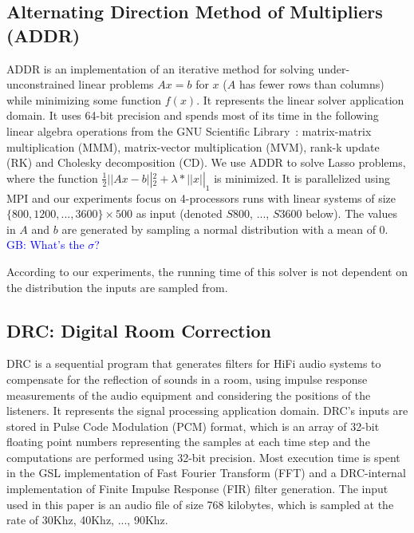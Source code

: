 \documentclass[10pt, conference, compsocconf]{IEEEtran}
\newcommand{\greg}[1]{%
  \textcolor{blue}{GB: #1}
}
\begin{document}
\subsection{Alternating Direction Method of Multipliers (ADDR)}
\label{sec:apps:lasso}
ADDR is an implementation of an iterative method for solving under-unconstrained linear problems $Ax=b$ for $x$ ($A$ has fewer rows than columns) while minimizing some function $f(x)$.
It represents the linear solver application domain.
It uses 64-bit precision and spends most of its time in the following linear algebra operations from the GNU Scientific Library~\cite{gsl:2011}: matrix-matrix multiplication (MMM), matrix-vector multiplication (MVM), rank-k update (RK) and Cholesky decomposition (CD).
We use ADDR to solve Lasso problems, where the function $\frac{1}{2} \left|| Ax - b \right||_2^2 + \lambda*\left|| x \right||_1$ is minimized.
It is parallelized using MPI and our experiments focus on 4-processors runs with linear systems of size $\{800, 1200, ..., 3600\} \times 500$ as input (denoted $S800$, ..., $S3600$ below).%
The values in $A$ and $b$ are generated by sampling a normal distribution with a mean of 0. \greg{What's the $\sigma$?}
According to our experiments, the running time of this solver is not dependent on the distribution the inputs are sampled from.

\subsection{DRC: Digital Room Correction}
\label{sec:apps:drc}

DRC is a sequential program that generates filters for HiFi audio systems to compensate for the reflection of sounds in a room, using impulse response measurements of the audio equipment and considering the positions of the listeners.
It represents the signal processing application domain.
DRC's inputs are stored in Pulse Code Modulation (PCM) format, which is an array of 32-bit floating point numbers representing the samples at each time step and the computations are performed using 32-bit precision.
Most execution time is spent in the GSL implementation of Fast Fourier Transform (FFT) and a DRC-internal implementation of Finite Impulse Response (FIR) filter generation.
The input used in this paper is an audio file of size 768 kilobytes, which is sampled at the rate of 30Khz, 40Khz, ..., 90Khz.
\end{document}
